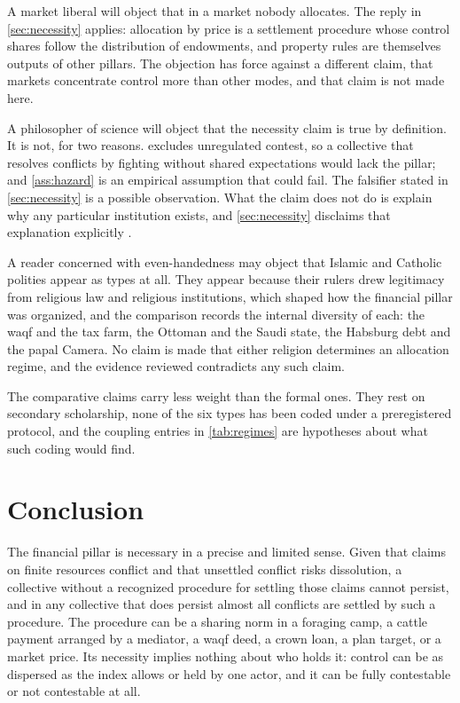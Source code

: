 \documentclass[11pt,letterpaper]{article}
\theoremstyle{definition}
\theoremstyle{remark}
\begin{document}
A market liberal will object that in a market nobody allocates. The reply in \cref{sec:necessity} applies: allocation by price is a settlement procedure whose control shares follow the distribution of endowments, and property rules are themselves outputs of other pillars. The objection has force against a different claim, that markets concentrate control more than other modes, and that claim is not made here.

A philosopher of science will object that the necessity claim is true by definition. It is not, for two reasons.  excludes unregulated contest, so a collective that resolves conflicts by fighting without shared expectations would lack the pillar; and \cref{ass:hazard} is an empirical assumption that could fail. The falsifier stated in \cref{sec:necessity} is a possible observation. What the claim does not do is explain why any particular institution exists, and \cref{sec:necessity} disclaims that explanation explicitly \citep{elster1983,hempel1959}.

A reader concerned with even-handedness may object that Islamic and Catholic polities appear as types at all. They appear because their rulers drew legitimacy from religious law and religious institutions, which shaped how the financial pillar was organized, and the comparison records the internal diversity of each: the waqf and the tax farm, the Ottoman and the Saudi state, the Habsburg debt and the papal Camera. No claim is made that either religion determines an allocation regime, and the evidence reviewed contradicts any such claim.

The comparative claims carry less weight than the formal ones. They rest on secondary scholarship, none of the six types has been coded under a preregistered protocol, and the coupling entries in \cref{tab:regimes} are hypotheses about what such coding would find.

\section{Conclusion}
\label{sec:conclusion}

The financial pillar is necessary in a precise and limited sense. Given that claims on finite resources conflict and that unsettled conflict risks dissolution, a collective without a recognized procedure for settling those claims cannot persist, and in any collective that does persist almost all conflicts are settled by such a procedure. The procedure can be a sharing norm in a foraging camp, a cattle payment arranged by a mediator, a waqf deed, a crown loan, a plan target, or a market price. Its necessity implies nothing about who holds it: control can be as dispersed as the index allows or held by one actor, and it can be fully contestable or not contestable at all.
\end{document}
